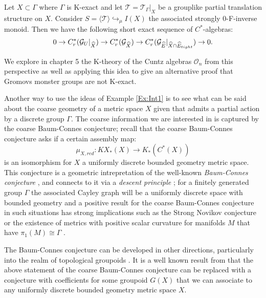 \begin{thm}
Let $X \subset \Gamma$ where $\Gamma$ is K-exact and let $\mathcal{T}=\mathcal{T}_{\Gamma}|_{X}$ be a grouplike partial translation structure on $X$. Consider $S=\langle \mathcal{T} \rangle \hookrightarrow_{\mu} I(X)$ the associated strongly 0-F-inverse monoid. Then we have the following short exact sequence of $C^{*}$-algebras:
\begin{equation*}
0 \rightarrow C^{*}_{r}(\mathcal{G}_{U}|_{\widehat{X}}) \rightarrow C^{*}_{r}(\mathcal{G}_{\widehat{X}}) \rightarrow C^{*}_{r}(\mathcal{G}_{\widehat{E}}|_{\widehat{X}\cap\widehat{E}_{tight}}) \rightarrow 0.
\end{equation*}
\end{thm}

We explore in chapter 5 the K-theory of the Cuntz algebras $\mathcal{O}_{n}$ from this perspective as well as applying this idea to give an alternative proof that Gromovs monster groups are not K-exact.

Another way to use the ideas of Example \ref{Ex:Int1} is to see what can be said about the coarse geometry of a metric space $X$ given that admits a partial action by a discrete group $\Gamma$. The coarse information we are interested in is captured by the coarse Baum-Connes conjecture; recall that the coarse Baum-Connes conjecture \cite{MR1388312} asks if a certain assembly map:
\begin{equation*}
\mu_{X,red}:KX_{*}(X) \longrightarrow K_{*}(C^{*}(X))
\end{equation*}
is an isomorphism for $X$ a uniformly discrete bounded geometry metric space. This conjecture is a geometric intrepretation of the well-known \textit{Baum-Connes conjecture} \cite{MR1292018}, and connects to it via a \textit{descent principle} \cite{MR1399087,MR1817560}; for a finitely generated group $\Gamma$ the associated Cayley graph will be a uniformly discrete space with bounded geometry and a positive result for the coarse Baum-Connes conjecture in such situations has strong implications such as the Strong Novikov conjecture \cite{MR866507} or the existence of metrics with positive scalar curvature for manifolds $M$ that have $\pi_{1}(M)\cong \Gamma$ \cite{MR1817560}.

The Baum-Connes conjecture can be developed in other directions, particularly into the realm of topological groupoids \cite{MR1798599}. It is a well known result from \cite{MR1905840} that the above statement of the coarse Baum-Connes conjecture can be replaced with a conjecture with coefficients for some groupoid $G(X)$ that we can associate to any uniformly discrete bounded geometry metric space $X$.

